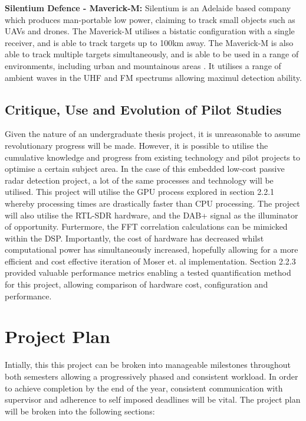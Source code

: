 \documentclass[12pt,a4paper]{article}
\begin{document}
\par \vspace{0.5cm} 
\noindent \textbf{Silentium Defence - Maverick-M:} Silentium is an Adelaide based company which produces man-portable low power, claiming to track small objects such as UAVs and drones. The Maverick-M utilises a bistatic configuration with a single receiver, and is able to track targets up to 100km away. The Maverick-M is also able to track multiple targets simultaneously, and is able to be used in a range of environments, including urban and mountainous areas \cite{Cilentium}. It utilises a range of ambient waves in the UHF and FM spectrums allowing maximul detection ability.

\subsection{Critique, Use and Evolution of Pilot Studies}
Given the nature of an undergraduate thesis project, it is unreasonable to assume revolutionary progress will be made. However, it is possible to utilise the cumulative knowledge and progress from existing technology and pilot projects to optimise a certain subject area. In the case of this embedded low-cost passive radar detection project, a lot of the same processes and technology will be utilised. This project will utilise the GPU process explored in section 2.2.1 whereby processing times are drastically faster than CPU processing. The project will also utilise the RTL-SDR hardware, and the DAB+ signal as the illuminator of opportunity. Furtermore, the FFT correlation calculations can be mimicked within the DSP. Importantly, the cost of hardware has decreased whilst computational power has simultaneously increased, hopefully allowing for a more efficient and cost effective iteration of Moser et. al implementation. Section 2.2.3 provided valuable performance metrics enabling a tested quantification method for this project, allowing comparison of hardware cost, configuration and performance. 

\section{Project Plan}
Intially, this this project can be broken into manageable milestones throughout both semesters allowing a progressively phased and consistent workload. In order to achieve completion by the end of the year, consistent communication with supervisor and adherence to self imposed deadlines will be vital. The project plan will be broken into the following sections:
\end{document}
